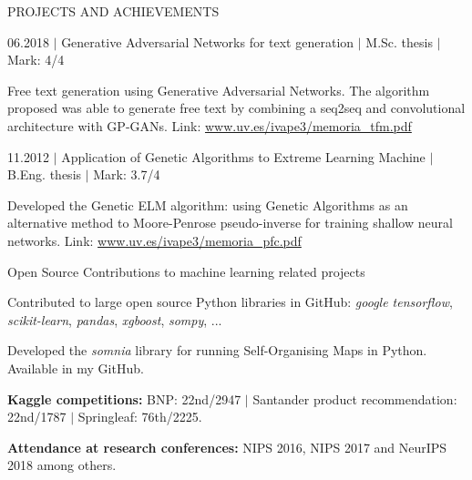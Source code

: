 \documentclass{resume} %
\begin{document}

\begin{rSection}{PROJECTS AND ACHIEVEMENTS}

\begin{rSubsection}{06.2018 $|$ Generative Adversarial Networks for text generation  $|$  \textnormal{M.Sc. thesis  $|$  Mark: 4/4}}{}{}{}  %

\vspace{-3pt}

\item Free text generation using Generative Adversarial Networks. The algorithm proposed was able to generate free text by combining a seq2seq and convolutional architecture with GP-GANs. Link: \href{https://www.uv.es/ivape3/memoria_tfm.pdf}{www.uv.es/ivape3/memoria\_tfm.pdf}

\end{rSubsection}

\vspace{-6pt}

\begin{rSubsection}{11.2012 $|$ Application of Genetic Algorithms to Extreme Learning Machine  $|$  \textnormal{B.Eng. thesis  $|$  Mark: 3.7/4}}
{}{}{}

\vspace{-3pt}

\item Developed the Genetic ELM algorithm: using Genetic Algorithms as an alternative method to Moore-Penrose pseudo-inverse for training shallow neural networks. Link: \href{https://www.uv.es/ivape3/memoria_pfc.pdf}{www.uv.es/ivape3/memoria\_pfc.pdf}

\end{rSubsection}

\vspace{-6pt}

\begin{rSubsection}{Open Source Contributions to machine learning related projects}
	{}{}{}

	\vspace{-3pt}

	\item Contributed to large open source Python libraries in GitHub: \textit{google tensorflow}, \textit{scikit-learn}, \textit{pandas}, \textit{xgboost}, \textit{sompy}, ...
	\item Developed the \textit{somnia} library for running Self-Organising Maps in Python. Available in my GitHub.
\end{rSubsection}

\vspace{-6pt}

\textbf{Kaggle competitions:} BNP: 22nd/2947 $|$ Santander product recommendation: 22nd/1787 $|$ Springleaf: 76th/2225.

\vspace{-6pt}

\textbf{Attendance at research conferences:} NIPS 2016, NIPS 2017 and NeurIPS 2018 among others.


\end{rSection}
\end{document}
